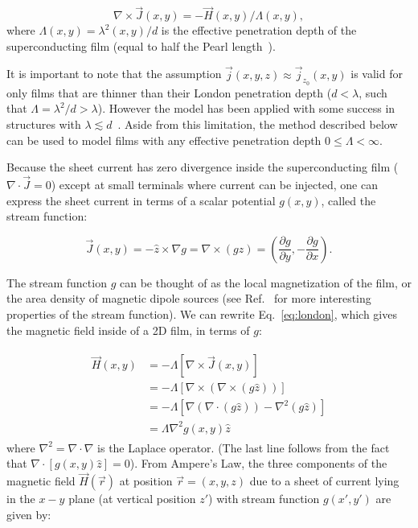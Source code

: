 \documentclass[final,3p,times]{elsarticle}
\newcounter{bla}
\begin{document}
\begin{equation}
    \label{eq:london}
    \nabla\times\vec{J}(x, y)=-\vec{H}(x, y)/\Lambda(x, y),
\end{equation}
where $\Lambda(x, y)=\lambda^2(x, y)/d$ is the effective penetration depth
of the superconducting film (equal to half the Pearl length~\cite{Pearl1964-cl}).

It is important to note that the assumption $\vec{j}(x, y, z)\approx\vec{j}_{z_0}(x, y)$ is valid for only films that are thinner than their London penetration depth ($d<\lambda$, such that $\Lambda=\lambda^2/d>\lambda$). However the model has been applied with some success in structures with $\lambda\lesssim d$~\cite{Kirtley2016-zz,Kirtley2016-gt}. Aside from this limitation, the method described below can be used to model films with any effective penetration depth $0\leq\Lambda<\infty$.

Because the sheet current has zero divergence inside the superconducting film ($\nabla\cdot\vec{J}=0$)
except at small terminals where current can be injected, one can express the sheet current in terms
of a scalar potential $g(x, y)$, called the stream function:

\begin{equation}
    \label{eq:stream}
    \vec{J}(x, y) = -\hat{z}\times\nabla g
    = \nabla\times(g\hat{z})
    = \left(\frac{\partial g}{\partial y}, -\frac{\partial g}{\partial x}\right).
\end{equation}

The stream function $g$ can be thought of as the local magnetization of the film, or the area density of magnetic dipole sources (see Ref.~\cite{Brandt2005-wj} for more interesting properties of the stream function). We can rewrite Eq.~\ref{eq:london}, which gives the magnetic field inside of a 2D film, in terms of $g$:

\begin{align}
    \label{eq:london_stream}
    \begin{split}
        \vec{H}(x, y) &= -\Lambda\left[\nabla\times\vec{J}(x, y)\right]\\
        &= -\Lambda\left[\nabla\times\left(\nabla\times(g\hat{z})\right)\right]\\
        &= -\Lambda\left[\nabla(\nabla\cdot(g\hat{z}))-\nabla^2(g\hat{z})\right]\\
        &=\Lambda\nabla^2g(x,y)\hat{z}
    \end{split}
\end{align}
where $\nabla^2=\nabla\cdot\nabla$ is the Laplace operator. (The last line follows from the fact that $\nabla\cdot\left[g(x,y)\hat{z}\right] = 0$). From Ampere's Law, the three components of the magnetic field $\vec{H}(\vec{r})$ at position $\vec{r}=(x, y, z)$ due to a sheet of current lying in the $x-y$ plane (at vertical position $z'$) with stream function $g(x', y')$ are given by:
\end{document}
